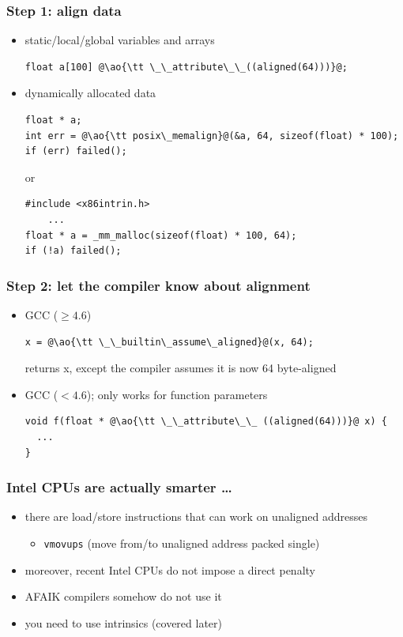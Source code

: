 \documentclass[12pt,dvipdfmx]{beamer}
\newcommand{\ao}[1]{{\color{blue}#1}}
\begin{document}
\begin{frame}[fragile]
\frametitle{Step 1: align data}

\begin{itemize}
\item static/local/global variables and arrays
\begin{lstlisting}
float a[100] @\ao{\tt \_\_attribute\_\_((aligned(64)))}@;
\end{lstlisting}

\item dynamically allocated data
\begin{lstlisting}
float * a;
int err = @\ao{\tt posix\_memalign}@(&a, 64, sizeof(float) * 100);
if (err) failed();
\end{lstlisting}
or
\begin{lstlisting}
#include <x86intrin.h>
    ...
float * a = _mm_malloc(sizeof(float) * 100, 64);
if (!a) failed();
\end{lstlisting}
\end{itemize}
\end{frame}

\begin{frame}[fragile]
\frametitle{Step 2: let the compiler know about alignment}
\begin{itemize}
\item GCC ($\geq 4.6$)
\begin{lstlisting}
x = @\ao{\tt \_\_builtin\_assume\_aligned}@(x, 64);
\end{lstlisting}
returns x, except the compiler assumes it is now 64 byte-aligned

\item GCC ($< 4.6$); only works for function parameters
\begin{lstlisting}
void f(float * @\ao{\tt \_\_attribute\_\_ ((aligned(64)))}@ x) {
  ...
}    
\end{lstlisting}
\end{itemize}
\end{frame}

\begin{frame}[fragile]
\frametitle{Intel CPUs are actually smarter \ldots}
\begin{itemize}
\item there are load/store instructions that
  can work on unaligned addresses
  \begin{itemize}
  \item {\tt vmov\ao{u}ps}  (move from/to unaligned address packed single)
  \end{itemize}

\item moreover, recent Intel CPUs do not impose a direct penalty

\item AFAIK compilers somehow do not use it
\item you need to use intrinsics (covered later)

\end{itemize}
\end{frame}
\fi
\end{document}
